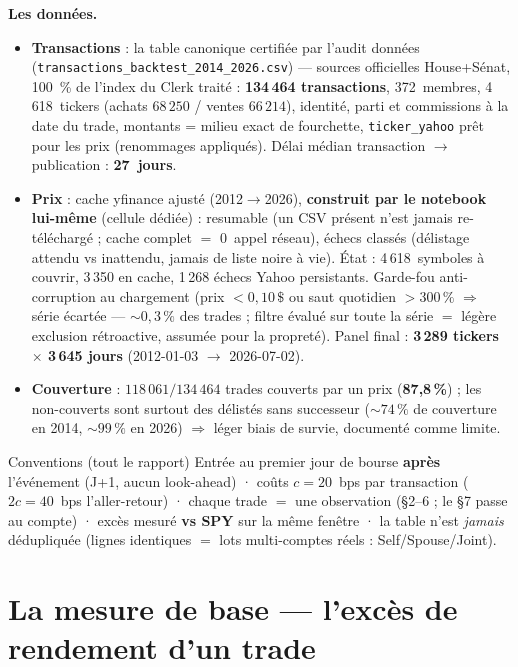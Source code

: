 \documentclass[11pt,a4paper]{article}
\newcommand{\code}[1]{\texttt{\small #1}}
\begin{document}
\textbf{Les données.}
\begin{itemize}[leftmargin=1.4em,itemsep=1pt]
\item \textbf{Transactions} : la table canonique certifiée par l'audit données
      (\code{transactions\_backtest\_2014\_2026.csv}) --- sources officielles House+Sénat, 100~\% de l'index
      du Clerk traité : \textbf{134\,464 transactions}, 372~membres, 4\,618~tickers
      (achats $68\,250$ / ventes $66\,214$), identité, parti et commissions à la date du trade,
      montants = milieu exact de fourchette, \code{ticker\_yahoo} prêt pour les prix (renommages appliqués).
      Délai médian transaction $\to$ publication : \textbf{27~jours}.
\item \textbf{Prix} : cache yfinance ajusté (2012$\to$2026), \textbf{construit par le notebook lui-même}
      (cellule dédiée) : resumable (un CSV présent n'est jamais re-téléchargé ; cache complet $=$ 0~appel
      réseau), échecs classés (délistage attendu vs inattendu, jamais de liste noire à vie). État :
      4\,618~symboles à couvrir, 3\,350 en cache, 1\,268 échecs Yahoo persistants. Garde-fou
      anti-corruption au chargement (prix $<0{,}10\,\$$ ou saut quotidien $>300\,\%$ $\Rightarrow$ série
      écartée --- $\sim0{,}3\,\%$ des trades ; filtre évalué sur toute la série $=$ légère exclusion
      rétroactive, assumée pour la propreté). Panel final : \textbf{3\,289 tickers $\times$ 3\,645 jours}
      (2012-01-03 $\to$ 2026-07-02).
\item \textbf{Couverture} : $118\,061/134\,464$ trades couverts par un prix (\textbf{87{,}8\,\%}) ; les
      non-couverts sont surtout des délistés sans successeur ($\sim74\,\%$ de couverture en 2014,
      $\sim99\,\%$ en 2026) $\Rightarrow$ léger biais de survie, documenté comme limite.
\end{itemize}

\begin{defbox}{Conventions (tout le rapport)}
Entrée au premier jour de bourse \textbf{après} l'événement (J+1, aucun look-ahead) · coûts
$c=20$~bps par transaction ($2c=40$~bps l'aller-retour) · chaque trade $=$ une observation (\S2--6 ; le
\S7 passe au compte) · excès mesuré \textbf{vs SPY} sur la même fenêtre · la table n'est \emph{jamais}
dédupliquée (lignes identiques $=$ lots multi-comptes réels : Self/Spouse/Joint).
\end{defbox}

\section{La mesure de base --- l'excès de rendement d'un trade}\label{sec:mesure}
\end{document}

